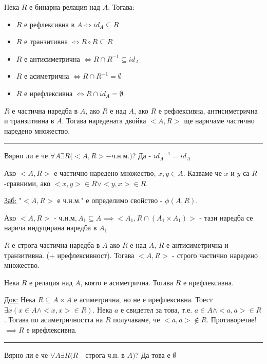 \documentclass[fleqn, titlepage, 12pt]{report}
\begin{document}
 Нека $R$ е бинарна релация над $A$. Тогава:
\begin{itemize}
  \item $R$ е рефлексивна в $A \Longleftrightarrow id_A \subseteq R$ 
  \item $R$ е транзитивна $\Longleftrightarrow R \circ R \subseteq R$
  \item $R$ е антисиметрична $\Longleftrightarrow R \cap R^{-1} \subseteq id_A$
  \item $R$ е асиметрична $\Longleftrightarrow R \cap R^{-1} = \emptyset$
  \item $R$ е ирефлексивна $\Longleftrightarrow R \cap id_A = \emptyset$
\end{itemize}

 $R$ е частична наредба в $A$, ако $R$ е над $A$, ако $R$ е рефлексивна, антисиметрична и транзитивна в $A$.
Тогава наредената двойка $<A,R>$ ще наричаме частично наредено множество.

\bigbreak
\hrule
\bigbreak

Вярно ли е че $\forall{A}\exists{R}(<A,R> - $ч.н.м.$)$? Да - ${id_A}^{-1} = id_A$
\bigbreak

 Ако $<A,R>$ е частично наредено множество, $x,y \in A$. Казваме че $x$ и $y$ са $R$-сравними, ако
$<x,y> \in R \lor <y,x> \in R$.
\bigbreak

\underline{Заб:} "$<A,R>$ е ч.н.м." е определимо свойство - $\phi(A,R)$.

Ако $<A,R>$ - ч.н.м$, A_1 \subseteq A \implies <A_1, R \cap (A_1 \times A_1)>$ - тази наредба се нарича индуцирана наредба в $A_1$
\bigbreak

 $R$ е строга частична наредба в $A$ ако $R$ е над $A$, $R$ е антисиметрична и транзитивна. (+ ирефлексивност).
Тогава $<A,R>$ - строго частично наредено множество.
\bigbreak

 Нека $R$ е релация над $A$, която е асиметрична. Тогава $R$ е ирефлексивна.
\bigbreak

\underline{Док:} Нека $R \subseteq A \times A$ е асиметрична, но не е ирефлексивна.
Тоест $\exists{x}(x \in A \land <x,x> \in R)$. Нека $a$ е свидетел за това, т.е. $a \in A \land <a,a> \in R$.
Тогава по асиметричността на $R$ получаваме, че $<a,a> \notin R$. Противоречие! $\implies R$ е ирефлексивна.

\bigbreak
\hrule
\bigbreak

Вярно ли е че $\forall{A}\exists{R}(R $ - строга ч.н. в $A)$? Да това е $\emptyset$
\bigbreak
\end{document}
